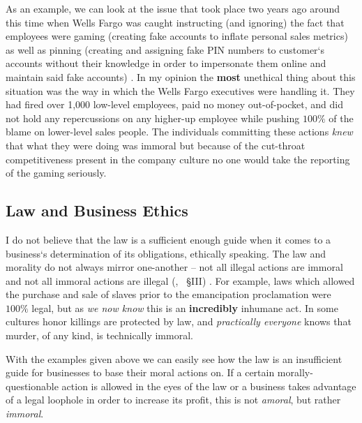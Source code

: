 \documentclass[12pt]{article}
\newcommand{\CiteSection}[2]{%
    (\cite{#1}, ~\S {#2})\hspace{-4pt}
  }
\begin{document}
      As an example, we can look at the issue that took place two years ago around this time
        when Wells Fargo was caught instructing (and ignoring) the fact that employees were
        gaming (creating fake accounts to inflate personal sales metrics) as well as
        pinning (creating and assigning fake PIN numbers to customer`s accounts without
        their knowledge in order to impersonate them online and maintain said fake accounts)
        \autocite{mclean_2017}. In my opinion the \textbf{most} unethical thing about this
        situation was the way in which the Wells Fargo executives were handling it. They
        had fired over 1,000 low-level employees, paid no money out-of-pocket, and did not
        hold any repercussions on any higher-up employee while pushing $100\%$ of the blame
        on lower-level sales people. The individuals committing these actions \textit{knew}
        that what they were doing was immoral but because of the cut-throat competitiveness
        present in the company culture no one would take the reporting of the gaming
        seriously.

    \subsection{Law and Business Ethics}
      I do not believe that the law is a sufficient enough guide when it comes to a business`s
        determination of its obligations, ethically speaking. The law and morality do not
        always mirror one-another -- not all illegal actions are immoral and not all immoral
        actions are illegal \CiteSection{hellmers_2020}{III}. For example, laws which allowed
        the purchase and sale of slaves prior to the emancipation proclamation were $100\%$
        legal, but as \textit{we now know} this is an \textbf{incredibly} inhumane act. In
        some cultures honor killings are protected by law, and \textit{practically everyone}
        knows that murder, of any kind, is technically immoral.
        
      With the examples given above we can easily see how the law is an insufficient guide
        for businesses to base their moral actions on. If a certain morally-questionable
        action is allowed in the eyes of the law or a business takes advantage of a legal
        loophole in order to increase its profit, this is not \textit{amoral}, but rather
        \textit{immoral}.


\end{document}
